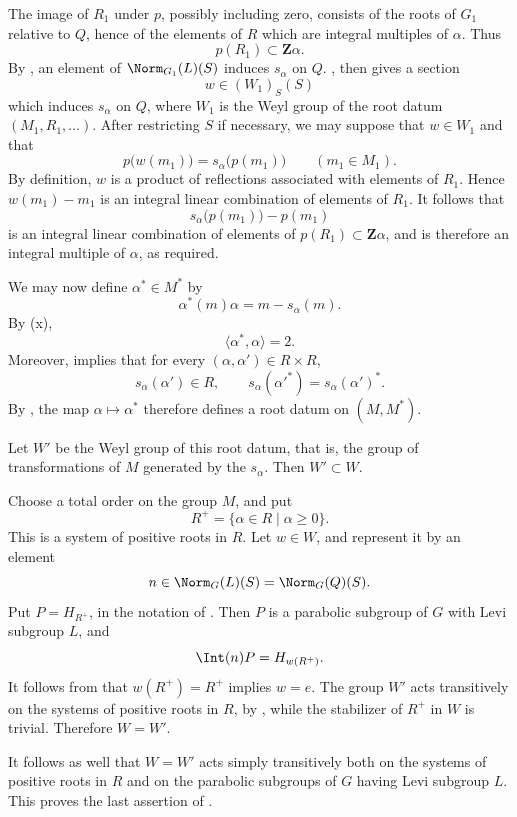 The image of \(R_1\) under \(p\), possibly including zero, consists
of the roots of \(G_1\) relative to \(Q\), hence of the elements of
\(R\) which are integral multiples of \(\alpha\).  Thus
\[
 p(R_1)\subset\mathbf Z\alpha.
\]
By \textup{}, an element of \(\Norm_{G_1}(L)(S)\) induces
\(s_\alpha\) on \(Q\).  , then gives a section
\[
 w\in(W_1)_S(S)
\]
which induces \(s_\alpha\) on \(Q\), where \(W_1\) is the Weyl group
of the root datum \((M_1,R_1,\ldots)\).  After restricting \(S\) if
necessary, we may suppose that \(w\in W_1\) and that
\[
 p\bigl(w(m_1)\bigr)=s_\alpha\bigl(p(m_1)\bigr)
 \qquad(m_1\in M_1).
\]
By definition, \(w\) is a product of reflections associated with
elements of \(R_1\).  Hence \(w(m_1)-m_1\) is an integral linear
combination of elements of \(R_1\).  It follows that
\[
 s_\alpha\bigl(p(m_1)\bigr)-p(m_1)
\]
is an integral linear combination of elements of
\(p(R_1)\subset\mathbf Z\alpha\), and is therefore an integral
multiple of \(\alpha\), as required.


We may now define \(\alpha^*\in M^*\) by
\[
 \alpha^*(m)\alpha=m-s_\alpha(m).
\]
By \textup{(x)},
\[
 \langle\alpha^*,\alpha\rangle=2.
\]
Moreover, \textup{} implies that for every
\((\alpha,\alpha')\in R\times R\),
\[
 s_\alpha(\alpha')\in R,\qquad
 s_\alpha(\alpha'^*)=s_\alpha(\alpha')^*.
\]
By , the map
\(\alpha\mapsto\alpha^*\) therefore defines a root datum on
\((M,M^*)\).


Let \(W'\) be the Weyl group of this root datum, that is, the group
of transformations of \(M\) generated by the \(s_\alpha\).  Then
\(W'\subset W\).

Choose a total order on the group \(M\), and put
\[
 R^+=\{\alpha\in R\mid\alpha\geq0\}.
\]
This is a system of positive roots in \(R\).  Let \(w\in W\), and
represent it by an element
\[
 n\in\Norm_G(L)(S)=\Norm_G(Q)(S).
\]
Put \(P=H_{R^+}\), in the notation of .  Then \(P\) is a
parabolic subgroup of \(G\) with Levi subgroup \(L\), and
\[
 \Int(n)P=H_{w(R^+)}.
\]
It follows from  that \(w(R^+)=R^+\) implies \(w=e\).  The group
\(W'\) acts transitively on the systems of positive roots in \(R\),
by , while the stabilizer of \(R^+\) in \(W\) is
trivial.  Therefore \(W=W'\).

It follows as well that \(W=W'\) acts simply transitively both on
the systems of positive roots in \(R\) and on the parabolic
subgroups of \(G\) having Levi subgroup \(L\).  This proves the last
assertion of .
\SGAQED
